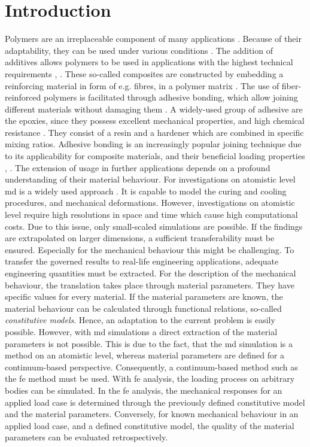 \chapter{Introduction}\label{chap:introduction}

Polymers are an irreplaceable component of many applications \cite{koltzenburg_polymere_2024}. 
Because of their adaptability, they can be used under various conditions .
The addition of additives allows polymers to be used in applications with the highest technical requirements \cite{ries_characterization_2023}, \cite{rajak_fiber-reinforced_2019}.
These so-called composites are constructed by embedding a reinforcing material in form of e.g. fibres, in a polymer matrix \cite{jeevi_review_2019}.
The use of fiber-reinforced polymers is facilitated through adhesive bonding, which allow joining different materials without damaging them \cite{ries_deciphering_nodate}. 
A widely-used group of adhesive are the epoxies, since they possess excellent mechanical properties, and high chemical resistance \cite{prolongo_comparative_2006}. 
They consist of a resin and a hardener which are combined in specific mixing ratios. 
Adhesive bonding is an increasingly popular joining technique due to its applicability for composite materials, and their beneficial loading properties \cite{campilho_extended_2011}, \cite{pramanik_joining_2017}. The extension of usage in further applications depends on a profound understanding of their material behaviour. For investigations on atomistic level \acrfull{md} is a widely used approach  \cite{ries_mechanical_2024}. It is capable to model the curing and cooling  procedures, and mechanical deformations. However, investigations on atomistic level require high resolutions in space and time which cause high computational costs. Due to this issue, only small-scaled simulations are possible. If the findings are extrapolated on larger dimensions, a sufficient transferability must be ensured. Especially for the mechanical behaviour this might be challenging. To transfer the governed results to real-life engineering applications, adequate engineering quantities must be extracted. For the description of the mechanical behaviour, the translation takes place through material parameters. They have specific values for every material. If the material parameters are known, the material behaviour can be calculated through functional relations, so-called \emph{constitutive models}.
Hence, an adaptation to the current problem is easily possible. However, with \acrshort{md} simulations a direct extraction of the material parameters is not possible. This is due to the fact, that the \acrshort{md} simulation is a method on an atomistic level, whereas material parameters are defined for a continuum-based perspective. Consequently, a continuum-based method such as the \acrfull{fe} method must be used. With \acrshort{fe} analysis, the loading process on arbitrary bodies can be simulated. In the \acrshort{fe} analysis, the mechanical responses for an applied load case is determined through the previously defined constitutive model and the material parameters. Conversely, for known mechanical behaviour in an applied load case, and a defined constitutive model, the quality of the material parameters can be evaluated retrospectively. 
